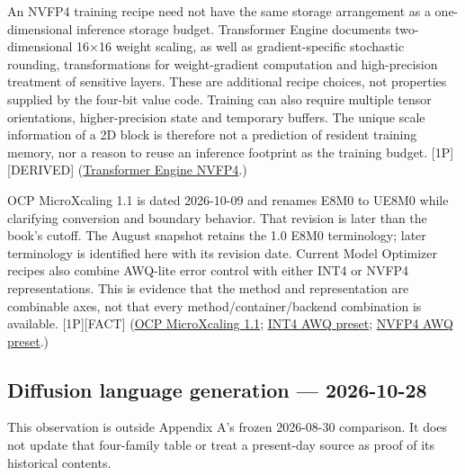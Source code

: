 An NVFP4 training recipe need not have the same storage arrangement as a
one-dimensional inference storage budget. Transformer Engine documents
two-dimensional 16×16 weight scaling, as well as gradient-specific
stochastic rounding, transformations for weight-gradient computation and
high-precision treatment of sensitive layers. These are additional
recipe choices, not properties supplied by the four-bit value code.
Training can also require multiple tensor orientations, higher-precision
state and temporary buffers. The unique scale information of a 2D block
is therefore not a prediction of resident training memory, nor a reason
to reuse an inference footprint as the training budget.
\mbox{{[}1P{]}}\hspace{0pt}\mbox{{[}DERIVED{]}}
(\href{https://docs.nvidia.com/deeplearning/transformer-engine/features/low_precision_training/nvfp4/nvfp4.html}{Transformer
Engine NVFP4}.)

OCP MicroXcaling 1.1 is dated 2026-10-09 and renames E8M0 to UE8M0 while
clarifying conversion and boundary behavior. That revision is later than
the book's cutoff. The August snapshot retains the 1.0 E8M0 terminology;
later terminology is identified here with its revision date. Current
Model Optimizer recipes also combine AWQ-lite error control with either
INT4 or NVFP4 representations. This is evidence that the method and
representation are combinable axes, not that every
method/container/backend combination is available. \mbox{{[}1P{]}}\hspace{0pt}\mbox{{[}FACT{]}}
(\href{https://www.opencompute.org/wp-content/uploads/2026/10/OCP_MicroXcaling_Spec_v1.1.0.pdf}{OCP
MicroXcaling 1.1};
\href{https://raw.githubusercontent.com/NVIDIA/Model-Optimizer/580ffff1cddb9b20a38b7434e6290654ebf96a8f/modelopt_recipes/configs/ptq/presets/model/int4_awq.yaml}{INT4
AWQ preset};
\href{https://raw.githubusercontent.com/NVIDIA/Model-Optimizer/580ffff1cddb9b20a38b7434e6290654ebf96a8f/modelopt_recipes/configs/ptq/presets/model/nvfp4_awq_lite.yaml}{NVFP4
AWQ preset}.)

\subsection*{Diffusion language generation ---
2026-10-28}\label{diffusion-language-generation-2026-10-28}

This observation is outside Appendix A's frozen 2026-08-30 comparison.
It does not update that four-family table or treat a present-day source
as proof of its historical contents.


